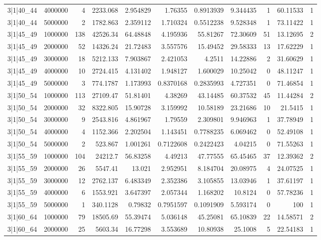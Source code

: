 \begin{tabular}{lrrrrrrrrrr}
3|1|40\_44 & 4000000 & 4 & 2233.068 & 2.954829 & 1.76355 & 0.8913939 & 9.344435 & 1 & 60.11533 & 1 \\
3|1|40\_44 & 5000000 & 2 & 1782.863 & 2.359112 & 1.710324 & 0.5512238 & 9.528348 & 1 & 73.11422 & 1 \\
3|1|45\_49 & 1000000 & 138 & 42526.34 & 64.48848 & 4.195936 & 55.81267 & 72.30609 & 51 & 13.12695 & 2 \\
3|1|45\_49 & 2000000 & 52 & 14326.24 & 21.72483 & 3.557576 & 15.49452 & 29.58333 & 13 & 17.62229 & 1 \\
3|1|45\_49 & 3000000 & 18 & 5212.133 & 7.903867 & 2.421053 & 4.2511 & 14.22886 & 2 & 31.60629 & 1 \\
3|1|45\_49 & 4000000 & 10 & 2724.415 & 4.131402 & 1.948127 & 1.600029 & 10.25042 & 0 & 48.11247 & 1 \\
3|1|45\_49 & 5000000 & 3 & 774.1787 & 1.173993 & 0.8370168 & 0.2835993 & 4.727351 & 0 & 71.46854 & 1 \\
3|1|50\_54 & 1000000 & 113 & 27109.47 & 51.81401 & 4.38269 & 43.14485 & 60.37532 & 45 & 11.44284 & 2 \\
3|1|50\_54 & 2000000 & 32 & 8322.805 & 15.90728 & 3.159992 & 10.58189 & 23.21686 & 10 & 21.5415 & 1 \\
3|1|50\_54 & 3000000 & 9 & 2543.816 & 4.861967 & 1.79559 & 2.309801 & 9.946963 & 1 & 37.78949 & 1 \\
3|1|50\_54 & 4000000 & 4 & 1152.366 & 2.202504 & 1.143451 & 0.7788235 & 6.069462 & 0 & 52.49108 & 1 \\
3|1|50\_54 & 5000000 & 2 & 523.867 & 1.001261 & 0.7122608 & 0.2422423 & 4.04215 & 0 & 71.55263 & 1 \\
3|1|55\_59 & 1000000 & 104 & 24212.7 & 56.83258 & 4.49213 & 47.77555 & 65.45465 & 37 & 12.39362 & 2 \\
3|1|55\_59 & 2000000 & 26 & 5547.41 & 13.021 & 2.952951 & 8.184704 & 20.08975 & 4 & 24.07525 & 1 \\
3|1|55\_59 & 3000000 & 12 & 2762.137 & 6.483349 & 2.352386 & 3.105855 & 13.03946 & 1 & 37.61197 & 1 \\
3|1|55\_59 & 4000000 & 6 & 1553.921 & 3.647397 & 2.057344 & 1.168202 & 10.8124 & 0 & 57.78236 & 1 \\
3|1|55\_59 & 5000000 & 1 & 340.1128 & 0.79832 & 0.7951597 & 0.1091909 & 5.593174 & 0 & 100 & 1 \\
3|1|60\_64 & 1000000 & 79 & 18505.69 & 55.39474 & 5.036148 & 45.25081 & 65.10839 & 22 & 14.58571 & 2 \\
3|1|60\_64 & 2000000 & 25 & 5603.34 & 16.77298 & 3.553689 & 10.80938 & 25.1008 & 5 & 22.54183 & 1 \\

\end{tabular}
